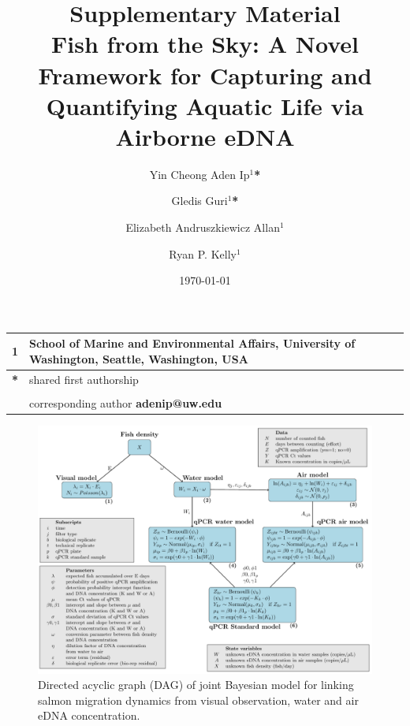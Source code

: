 \documentclass{article}
\title{Supplementary Material \\ \large{Fish from the Sky: A Novel Framework for Capturing and Quantifying Aquatic Life via Airborne eDNA}}
\author{Yin Cheong Aden Ip$^1$\textbf{*} \and
Gledis Guri$^1$\textbf{*} \and
Elizabeth Andruszkiewicz Allan$^1$ \and
Ryan P. Kelly$^1$}
\date{\today}
\begin{document}
\maketitle


\begin{center}
\begin{tabular}{ll}
1 & School of Marine and Environmental Affairs, University of Washington, Seattle, Washington, USA \\
\hline
\textbf{*} & shared first authorship\\
&\\
& corresponding author \textbf{adenip@uw.edu}
\end{tabular}
\end{center}


\clearpage
\begin{figure}[tbhp] 
\centering
\includegraphics[width=16.5cm]{Plots/DAG.pdf}  
\caption{Directed acyclic graph (DAG) of joint Bayesian model for linking salmon migration dynamics from visual observation, water and air eDNA concentration.}
\label{fig:DAG}
\end{figure}

\end{document}

